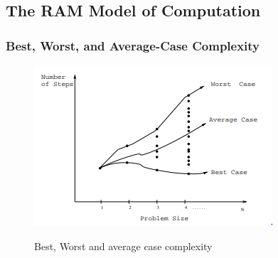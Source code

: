 \subsection{The RAM Model of Computation}

\noindent{}

\subsubsection{Best, Worst, and Average-Case Complexity}

\begin{figure}[H]
  \centering
     \includegraphics[scale=0.6]{./2_1.png}
  \label{fig:demo-diagram}
  \caption{Best, Worst and average case complexity}
\end{figure}

